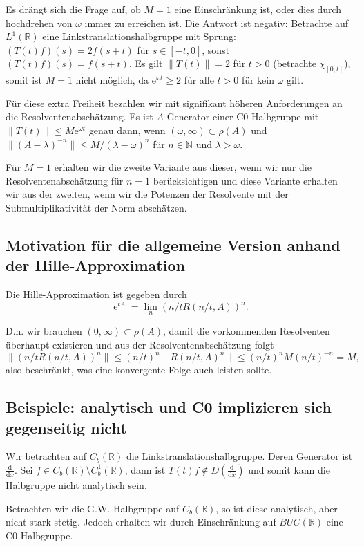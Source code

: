\documentclass[11pt,a4paper]{scrartcl}
\newcommand{\N}{\mathbb{N}} %
\newcommand{\R}{\mathbb{R}} %
\theoremstyle{plain}
\theoremstyle{definition}
\theoremstyle{remark}
\DeclareMathOperator{\e}{e}
\begin{document}
Es drängt sich die Frage auf, ob $M=1$ eine Einschränkung ist, oder dies durch hochdrehen von $\omega$ immer zu erreichen ist. Die Antwort ist negativ: Betrachte auf $L^1(\R)$ eine Linkstranslationshalbgruppe mit Sprung: $(T(t)f)(s) = 2f(s+t)$ für $s\in [-t,0]$, sonst $(T(t)f)(s)=f(s+t)$. Es gilt $\|T(t)\|=2$ für $t>0$ (betrachte $\chi_{[0,t]}$), somit ist $M=1$ nicht möglich, da $\mathrm{e}^{\omega t} \geq 2$ für alle $t>0$ für kein $\omega$ gilt.

Für diese extra Freiheit bezahlen wir mit signifikant höheren Anforderungen an die Resolventenabschätzung. Es ist $A$ Generator einer C0-Halbgruppe mit $\|T(t)\|\leq M \mathrm{e}^{\omega t}$ genau dann, wenn $(\omega, \infty)\subset \rho(A)$ und $\|(A-\lambda)^{-n}\| \leq M/(\lambda-\omega)^n$ für $n\in \N$ und $\lambda > \omega$.

Für $M=1$ erhalten wir die zweite Variante aus dieser, wenn wir nur die Resolventenabschätzung für $n=1$ berücksichtigen und diese Variante erhalten wir aus der zweiten, wenn wir die Potenzen der Resolvente mit der Submultiplikativität der Norm abschätzen.

\subsection{Motivation für die allgemeine Version anhand der Hille-Approximation}

Die Hille-Approximation ist gegeben durch $$\e^{tA}=\lim_n (n/t R(n/t,A))^n.$$

D.h. wir brauchen $(0,\infty)\subset \rho(A)$, damit die vorkommenden Resolventen überhaupt existieren und aus der Resolventenabschätzung folgt $$\|(n/t R(n/t,A))^n\|\leq (n/t)^n \|R(n/t,A)^n\| \leq (n/t)^n M (n/t)^{-n} = M,$$ also beschränkt, was eine konvergente Folge auch leisten sollte.

\subsection{Beispiele: analytisch und C0 implizieren sich gegenseitig nicht}

Wir betrachten auf $C_b(\R)$ die Linkstranslationshalbgruppe. Deren Generator ist $\frac{\mathrm{d}}{\mathrm{d}x}$. Sei $f\in C_b(\R) \setminus C_b^1(\R)$, dann ist $T(t)f \not\in D(\frac{\mathrm{d}}{\mathrm{d}x})$ und somit kann die Halbgruppe nicht analytisch sein.

Betrachten wir die G.W.-Halbgruppe auf $C_b(\R)$, so ist diese analytisch, aber nicht stark stetig. Jedoch erhalten wir durch Einschränkung auf $BUC(\R)$ eine C0-Halbgruppe.
\end{document}
